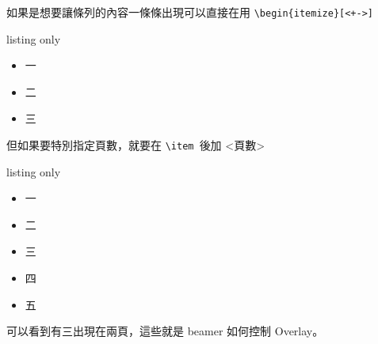 如果是想要讓條列的內容一條條出現可以直接在用 \verb`\begin{itemize}[<+->]`

\begin{tcblisting}{listing only}
\begin{itemize}[<+->]
\item 一
\item 二
\item 三
\end{itemize} 
\end{tcblisting}

但如果要特別指定頁數，就要在 \verb`\item `後加 <頁數>

\begin{tcblisting}{listing only}
\begin{itemize}[<+->]
\item<1-> 一
\item<2> 二
\item<3-4> 三
\item<4> 四
\item<5> 五
\end{itemize} 
\end{tcblisting}

可以看到有三出現在兩頁，這些就是 beamer 如何控制 Overlay。